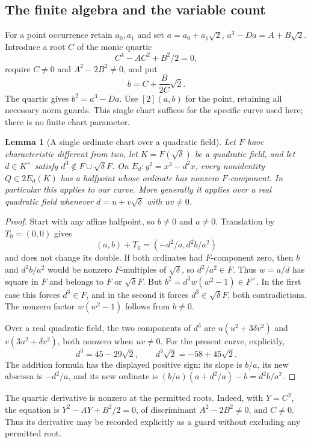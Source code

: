 \documentclass[11pt]{article}
\newtheorem{lemma}[theorem]{Lemma}
\theoremstyle{definition}
\begin{document}
\subsection{The finite algebra and the variable count}
For a point occurrence retain $a_0,a_1$ and set $a=a_0+a_1\sqrt2$,
$a^3-Da=A+B\sqrt2$. Introduce a root $C$ of the monic quartic
\[
 C^4-AC^2+B^2/2=0,
\]
require $C\ne0$ and $A^2-2B^2\ne0$, and put
\[
 b=C+\frac{B}{2C}\sqrt2.
\]
The quartic gives $b^2=a^3-Da$. Use $[2](a,b)$ for the point,
retaining all necessary norm guards. This single chart suffices for
the specific curve used here; there is no finite chart parameter.

\begin{lemma}[A single ordinate chart over a quadratic field]
Let $F$ have characteristic different from two, let
$K=F(\sqrt\delta)$ be a quadratic field, and let $d\in K^\times$
satisfy $d^3\notin F\cup\sqrt\delta F$. On
$E_d:y^2=x^3-d^2x$, every nonidentity $Q\in2E_d(K)$ has a
halfpoint whose ordinate has nonzero $F$-component. In particular
this applies to our curve. More generally it applies over a real
quadratic field whenever $d=u+v\sqrt\delta$ with $uv\ne0$.
\end{lemma}
\begin{proof}
Start with any affine halfpoint, so $b\ne0$ and $a\ne0$.
Translation by $T_0=(0,0)$ gives
\[
 (a,b)+T_0=(-d^2/a,d^2b/a^2)
\]
and does not change its double. If both ordinates had $F$-component
zero, then
$b$ and $d^2b/a^2$ would be nonzero $F$-multiples of $\sqrt\delta$,
so $d^2/a^2\in F$. Thus $w=a/d$ has square in $F$ and belongs to
$F$ or $\sqrt\delta F$. But $b^2=d^3w(w^2-1)\in F^\times$.
In the first case this forces $d^3\in F$, and in the second it
forces $d^3\in\sqrt\delta F$, both contradictions. The nonzero
factor $w(w^2-1)$ follows from $b\ne0$.

Over a real quadratic field, the two components of
$d^3$ are $u(u^2+3\delta v^2)$ and $v(3u^2+\delta v^2)$,
both nonzero when $uv\ne0$. For the present curve, explicitly,
\[
 d^3=45-29\sqrt2,\qquad
 d^3\sqrt2=-58+45\sqrt2.
\]
The addition formula has the displayed positive sign: its slope is
$b/a$, its new abscissa is $-d^2/a$, and its new ordinate is
$(b/a)(a+d^2/a)-b=d^2b/a^2$.
\end{proof}

The quartic derivative is nonzero at the permitted roots. Indeed,
with $Y=C^2$, the equation is $Y^2-AY+B^2/2=0$, of discriminant
$A^2-2B^2\ne0$, and $C\ne0$. Thus its derivative may be recorded
explicitly as a guard without excluding any permitted root.
\end{document}
